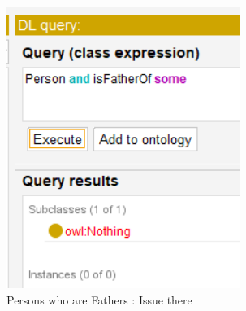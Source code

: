 \begin{figure}[H]
\begin{minipage}[b]{0.25\textwidth}
        \includegraphics[width=\textwidth]{images/1.1 - tuto/q3.png}
        \caption{Persons who are Fathers : Issue there}
        \label{fig:image3}
    \end{minipage}
    
    \vspace{0.5cm} %
    

\end{figure}
